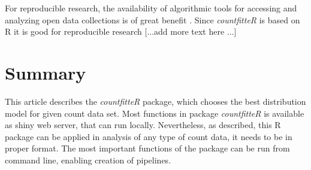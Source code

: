 For reproducible research, the availability of algorithmic tools for accessing and analyzing open data collections is of great benefit \cite{lahti_retrieval_2017}. Since \emph{countfitteR} is based on R it is good for reproducible research [...add more text here ...] \citep{leeper_archiving_2014,thioulouse_online_2010,rodiger_r_2015,liu_r_2014,Biecek_2017}





\section{Summary}

This article describes the \emph{countfitteR} package, which chooses the best distribution model for given count data set. Most functions in package \emph{countfitteR} is available as shiny web server, that can run locally. Nevertheless, as described, this R package can be applied in analysis of any type of count data, it needs to be in proper format. 
The most important functions of the package can be run from command line, enabling creation of pipelines.



\address{Jaros\l{}aw Chilmoniuk\\
  University of Wroc\l{}aw\\
  Pl. Uniwersytecki 1, Wroc\l{}aw\\
  Poland\\
  ORCiD: 0000-0001-5467-018X\\
  }


